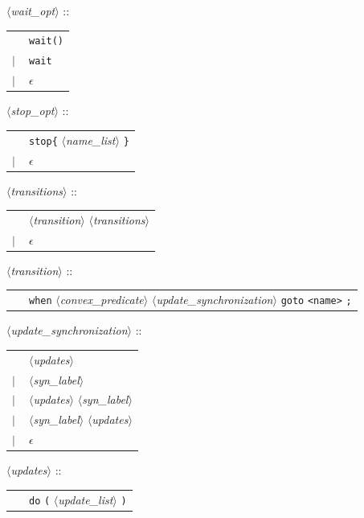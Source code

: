 \documentclass[a4paper,11pt]{report}
\newcommand{\emptystring}{$\epsilon$}
\newcommand{\nt}[1]{$\langle$\emph{#1}$\rangle$}
\newcommand{\regleGrammaire}[1]{\bigskip \noindent \nt{#1} :: \\}
\newcommand{\npec}[1]{\textcolor{green!50!black}{#1}}
\newcommand{\styleIMI}[1]{\textcolor{imicolor}{\texttt{#1}}}
\begin{document}
\regleGrammaire{\npec{wait\_opt}}
\begin{tabular}{l l}
	\ & \npec{\styleIMI{wait()}} \\
	$|$ & \npec{\styleIMI{wait}} \\
	$|$ & \npec{\emptystring} \\
\end{tabular}

\regleGrammaire{stop\_opt}
\begin{tabular}{l l}
	\ & \styleIMI{stop\{} \nt{name\_list} \styleIMI{\}} \\
	$|$ & \emptystring \\
\end{tabular}

	
\regleGrammaire{transitions}
\begin{tabular}{l l}
	\  & \nt{transition} \nt{transitions} \\
	$|$ & \emptystring \\
\end{tabular}

\regleGrammaire{transition}
\begin{tabular}{l l}
	\  & \styleIMI{when} \nt{convex\_predicate} \nt{update\_synchronization} \styleIMI{goto} \styleIMI{<name>} \styleIMI{;} \\
\end{tabular}

\regleGrammaire{update\_synchronization}
\begin{tabular}{l l}
	\  & \nt{updates} \\
	$|$ & \nt{syn\_label} \\
	$|$ & \nt{updates} \nt{syn\_label} \\
	$|$ & \nt{syn\_label} \nt{updates} \\
	$|$ & \emptystring \\
\end{tabular}

\regleGrammaire{updates}
\begin{tabular}{l l}
	\  & \styleIMI{do} \styleIMI{(} \nt{update\_list} \styleIMI{)} \\
\end{tabular}
\end{document}
